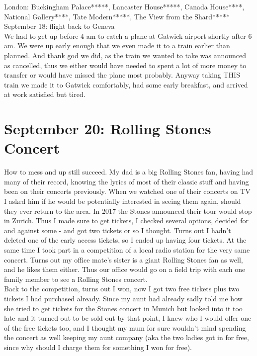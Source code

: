 London: Buckingham Palace*****, Lancaster House*****, Canada House****, National Gallery****, Tate Modern*****, The View from the Shard*****\\

September 18: flight back to Geneva\\
We had to get up before 4 am to catch a plane at Gatwick airport shortly after 6 am. We were up early enough that we even made it to a train earlier than planned. And thank god we did, as the train we wanted to take was announced as cancelled, thus we either would have needed to spent a lot of more money to transfer or would have missed the plane most probably. Anyway taking THIS train we made it to Gatwick comfortably, had some early breakfast, and arrived at work satisfied but tired.

\section{September 20: Rolling Stones Concert}
\label{2017RollingStones}

How to mess and up still succeed. My dad is a big Rolling Stones fan, having had many of their record, knowing the lyrics of most of their classic stuff and having been on their concerts previously. When we watched one of their concerts on TV I asked him if he would be potentially interested in seeing them again, should they ever return to the area. In 2017 the Stones announced their tour would stop in Zurich. Thus I made sure to get tickets, I checked several options, decided for and against some - and got two tickets or so I thought. Turns out I hadn't deleted one of the early access tickets, so I ended up having four tickets. At the same time I took part in a competition of a local radio station for the very same concert. Turns out my office mate's sister is a giant Rolling Stones fan as well, and he likes them either. Thus our office would go on a field trip with each one family member to see a Rolling Stones concert. \\
Back to the competition, turns out I won, now I got two free tickets plus two tickets I had purchased already. Since my aunt had already sadly told me how she tried to get tickets for the Stones concert in Munich but looked into it too late and it turned out to be sold out by that point, I knew who I would offer one of the free tickets too, and I thought my mum for sure wouldn't mind spending the concert as well keeping my aunt company (aka the two ladies got in for free, since why should I charge them for something I won for free).\\

